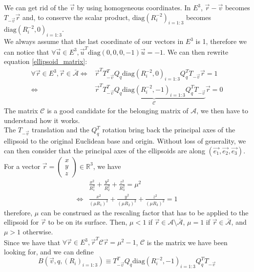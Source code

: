 \documentclass[class=report, float=false, crop=false]{standalone}
\begin{document}
We can get rid of the $\vec{v}$ by using homogeneous coordinates. In $E^3$, $\vec{r} - \vec{v}$ becomes $T_{-\vec{v}}\vec{r}$ and, to conserve the scalar product, $\text{diag}(R_i^{-2})_{i=1:3}$ becomes $\text{diag}(R_i^{-2},0)_{i=1:3}$.\\

We always assume that the last coordinate of our vectors in $E^3$ is 1, therefore we can notice that $\forall \vec{u} \in E^3, \vec{u}^T\text{diag}(0,0,0,-1)\vec{u} = -1$. We can then rewrite equation \ref{ellipsoid_matrix}:
\begin{align*}
\forall \vec{r} \in E^3, \vec{r} \in \bar{\mathcal{A}} \Leftrightarrow &\vec{r}^TT_{-\vec{v}}^TQ_q\text{diag}(R_i^{-2},0)_{i=1:3}Q_q^TT_{-\vec{v}}\vec{r} = 1\\
\Leftrightarrow&\vec{r}^T\underbrace{T_{-\vec{v}}^TQ_q\text{diag}(R_i^{-2},-1)_{i=1:3}Q_q^TT_{-\vec{v}}}_{\mathcal{C}}\vec{r} = 0
\end{align*}
The matrix $\mathcal{C}$ is a good candidate for the belonging matrix of $\mathcal{A}$, we then have to understand how it works.\\

The $T_{-\vec{v}}$ translation and the $Q_q^T$ rotation bring back the principal axes of the ellipsoid to the original Euclidean base and origin. Without loss of generality, we can then consider that the principal axes of the ellipsoids are along $(\vec{e_1},\vec{e_2},\vec{e_3})$.\\

For a vector \(\vec{r} = \begin{pmatrix} x \\ y \\ z \end{pmatrix} \in \mathbb{R}^3\), we have
\begin{align*}
&\frac{x^2}{R_1^2} + \frac{y^2}{R_2^2} + \frac{z^2}{R_3^2} = \mu^2\\
\Leftrightarrow & \frac{x^2}{(\mu R_1)^2} + \frac{y^2}{(\mu R_2)^2} + \frac{z^2}{(\mu R_3)^2} = 1
\end{align*}
therefore, $\mu$ can be construed as the rescaling factor that has to be applied to the ellipsoid for $\vec{r}$ to be on its surface. Then, $\mu < 1$ if $\vec{r} \in \mathcal{A}\setminus\bar{\mathcal{A}}$, $\mu = 1$ if $\vec{r} \in \bar{\mathcal{A}}$, and $\mu > 1$ otherwise.\\

Since we have that $\forall \vec{r} \in E^3, \vec{r}^T\mathcal{C}\vec{r} = \mu^2 - 1$, $\mathcal{C}$ is the matrix we have been looking for, and we can define
\begin{equation}
\boxed{B(\vec{v},q,(R_i)_{i=1:3}) \equiv T_{-\vec{v}}^TQ_q\text{diag}(R_i^{-2},-1)_{i=1:3}Q_q^TT_{-\vec{v}}}
\label{belonging_matrix}
\end{equation}
\end{document}
